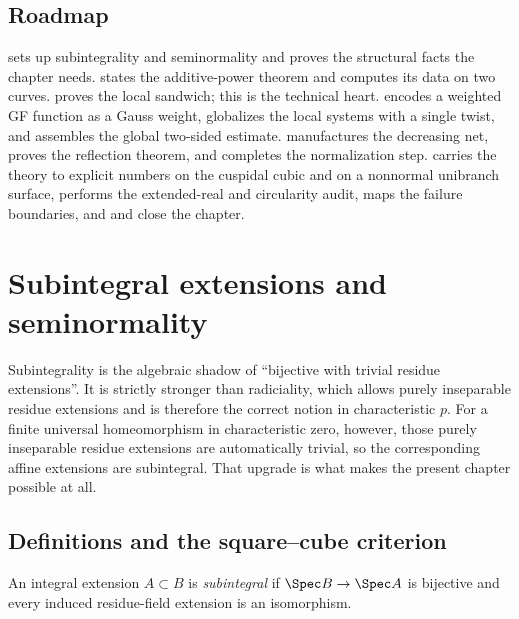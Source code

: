 \subsection{Roadmap}
\label{sec:ch44-roadmap}

 sets up subintegrality and seminormality and
proves the structural facts the chapter needs.
 states the additive-power theorem and computes
its data on two curves.   proves the local sandwich;
this is the technical heart.   encodes a weighted GF
function as a Gauss weight,  globalizes the
local systems with a single twist, and 
assembles the global two-sided estimate.
 manufactures the decreasing net,
 proves the reflection theorem, and
 completes the normalization step.
 carries the theory to explicit numbers on the
cuspidal cubic and on a nonnormal unibranch surface,
 performs the extended-real and circularity audit,
 maps the failure boundaries, and
 and  close the
chapter.

\section{Subintegral extensions and seminormality}
\label{sec:ch44-subintegral}

Subintegrality is the algebraic shadow of ``bijective with trivial residue
extensions''.  It is strictly stronger than radiciality, which allows purely
inseparable residue extensions and is therefore the correct notion in
characteristic $p$.  For a finite universal homeomorphism in
characteristic zero, however, those purely inseparable residue extensions
are automatically trivial, so the corresponding affine extensions are
subintegral.  That upgrade is what makes the present chapter possible at
all.

\subsection{Definitions and the square--cube criterion}
\label{sec:ch44-defs}

\begin{definition}
\label{def:bj-subintegral-extension}
An integral extension $A\subset B$ is \emph{subintegral} if
$\Spec B\to\Spec A$ is bijective and every induced residue-field extension
is an isomorphism.
\end{definition}


